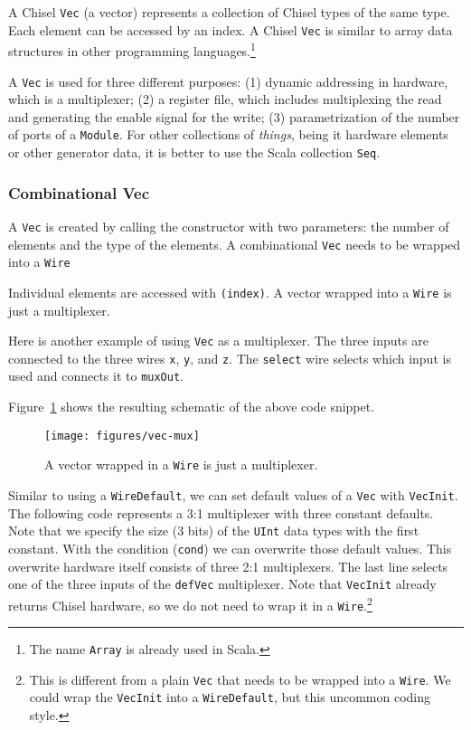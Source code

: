 \documentclass[%
    10pt,
    headinclude, footexclude,
    openright, %
    notitlepage,
    cleardoubleempty,
    headsepline,
    pointlessnumbers,
    bibtotoc, idxtotoc,
    ]{scrbook}
\newcommand{\scale}{0.7}
\newcommand{\code}[1]{{\lstinline[basicstyle=\small\ttfamily]{#1}}}
\newcommand{\codefoot}[1]{{\lstinline[basicstyle=\footnotesize\ttfamily]{#1}}}
\begin{document}
A Chisel \code{Vec} (a vector) represents a collection of Chisel types of the same type.
Each element can be accessed by an index. A Chisel \code{Vec} is similar
to array data structures in other programming languages.\footnote{The name \codefoot{Array}
is already used in Scala.}

A \code{Vec} is used for three different purposes: (1) dynamic addressing in hardware,
which is a multiplexer; (2) a register file, which includes multiplexing the read and
generating the enable signal for the write; (3) parametrization of the number of
ports of a \code{Module}. For other collections of \emph{things}, being it hardware elements
or other generator data, it is better to use the Scala collection \code{Seq}.

\subsubsection{Combinational Vec}


A \code{Vec} is created by calling the constructor with two parameters: the
number of elements and the type of the elements. A combinational \code{Vec}
needs to be wrapped into a \code{Wire}


\noindent Individual elements are accessed with \code{(index)}.
A vector wrapped into a \code{Wire} is just a multiplexer.


Here is another example of using \code{Vec} as a multiplexer.
The three inputs are connected to the three wires \code{x}, \code{y},
and \code{z}. The \code{select} wire selects which input is used and
connects it to \code{muxOut}.


\noindent Figure~\ref{fig:vec-mux} shows the resulting schematic of the above code snippet.

\begin{figure}
  \centering
  \texttt{[image: figures/vec-mux]}
  \caption{A vector wrapped in a \code{Wire} is just a multiplexer.}
  \label{fig:vec-mux}
\end{figure}

Similar to using a \code{WireDefault}, we can set default values of a \code{Vec} with \code{VecInit}.
The following code represents a 3:1 multiplexer with three constant defaults. Note that we specify
the size (3 bits) of the \code{UInt} data types with the first constant.
With the condition (\code{cond}) we can overwrite those default values.
This overwrite hardware itself consists of three 2:1 multiplexers. The last line selects
one of the three inputs of the \code{defVec} multiplexer. Note that \code{VecInit} already returns
Chisel hardware, so we do not need to wrap it in a \code{Wire}.\footnote{This is different from
a plain \codefoot{Vec} that needs to be wrapped into a \codefoot{Wire}. We could wrap the \codefoot{VecInit}
into a \codefoot{WireDefault}, but this uncommon coding style.}
\end{document}
